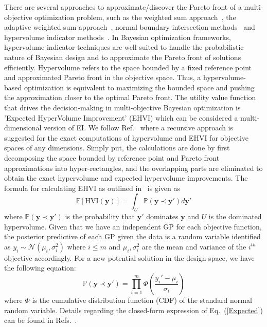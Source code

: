 There are several approaches to approximate/discover the Pareto front of a multi-objective optimization problem, such as the weighted sum approach~\cite{marler2010weighted}, the adaptive weighted sum approach~\cite{kim2005adaptive}, normal boundary intersection methods~\cite{das1998normal} and hypervolume indicator methods~\cite{beume2009s,bradstreet2010fast,emmerich2011hypervolume,fonseca2006improved,russo2013quick,yang2007novel,zitzler1999multiobjective}. In Bayesian optimization frameworks, hypervolume indicator techniques are well-suited to handle the probabilistic nature of Bayesian design and to approximate the Pareto front of solutions efficiently. Hypervolume refers to the space bounded by a fixed reference point and approximated Pareto front in the objective space. Thus, a hypervolume-based optimization is equivalent to maximizing the bounded space and pushing the approximation closer to the optimal Pareto front. The utility value function that drives the decision-making in multi-objective Bayesian optimization is 'Expected HyperVolume Improvement' (EHVI) which can be considered a multi-dimensional version of EI. 
We follow Ref.~\cite{zhao2018fast} where a recursive approach is suggested for the exact computations of hypervolume and EHVI for objective spaces of any dimensions. Simply put, the calculations are done by first decomposing the space bounded by reference point and Pareto front approximations into hyper-rectangles, and the overlapping parts are eliminated to obtain the exact hypervolume and expected hypervolume improvements.
The formula for calculating EHVI as outlined in~\cite{feliot2017bayesian} is given as
\begin{equation}
    \mathbb{E}[\textrm{{HVI}}({\mathbf{y}})] =\int_U \mathbb{P}(\mathbf{y} \prec{\mathbf{y}'})d{{\mathbf{y}'}}
    \label{Expected}
\end{equation}
where $\mathbb{P}(\mathbf{y} \prec \mathbf{y}')$ is the probability that $\mathbf{y}'$ dominates $\mathbf{y}$ and $U$ is the dominated hypervolume.
Given that we have an independent GP for each objective function, the posterior predictive of each GP given the data is a random variable identified as $y_i \sim \mathcal{N}(\mu_i , \sigma_i^2)$ where $ i\leq m  $ and $\mu_i,\sigma_i^2$ are the mean and variance of the $i^{th}$ objective accordingly. For a new potential solution in the design space, we have the following equation:
\begin{equation}
    \mathbb{P}(\mathbf{y} \prec \mathbf{y}') = \prod_{i=1}^m \Phi \left ( \frac{y_i' - \mu_i}{\sigma_i} \right )
    \label{prob}
\end{equation}
where $\Phi$ is the cumulative distribution function (CDF) of the standard normal random variable. Details regarding the closed-form expression of Eq.~(\ref{Expected}) can be found in Refs.~\cite{zhao2018fast,feliot2017bayesian,while2011fast,jaszkiewicz2018improved,khatamsaz2020efficient}.

